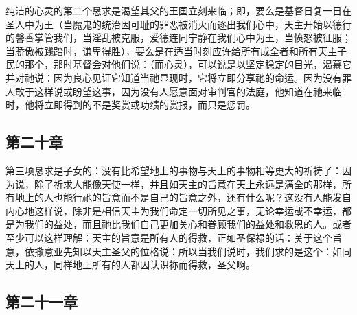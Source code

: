 纯洁的心灵的第二个恳求是渴望其父的王国立刻来临；即，要么是基督日复一日在圣人中为王（当魔鬼的统治因可耻的罪恶被消灭而逐出我们心中，天主开始以德行的馨香掌管我们，当淫乱被克服，爱德连同宁静在我们心中为王，当愤怒被征服；当骄傲被践踏时，谦卑得胜），要么是在适当时刻应许给所有成全者和所有天主子民的那个，那时基督会对他们说：（而心灵），可以说是以坚定稳定的目光，渴慕它并对祂说：因为良心见证它知道当祂显现时，它将立即分享祂的命运。因为没有罪人敢于这样说或盼望这事，因为没有人愿意面对审判官的法庭，他知道在祂来临时，他将立即得到的不是奖赏或功绩的赏报，而只是惩罚。\par


\subsection{第二十章}

\par

第三项恳求是子女的：没有比希望地上的事物与天上的事物相等更大的祈祷了：因为说，除了祈求人能像天使一样，并且如天主的旨意在天上永远是满全的那样，所有地上的人也能行祂的旨意而不是自己的旨意之外，还有什么呢？这没有人能发自内心地这样说，除非是相信天主为我们命定一切所见之事，无论幸运或不幸运，都是为我们的益处，而且祂比我们自己更加关心和眷顾我们的益处和救恩的人。或者至少可以这样理解：天主的旨意是所有人的得救，正如圣保禄的话：关于这个旨意，依撒意亚先知以天主圣父的位格说：所以当我们说时，我们求的是这个：如同天上的人，同样地上所有的人都因认识祢而得救，圣父啊。\par


\subsection{第二十一章}

\par

